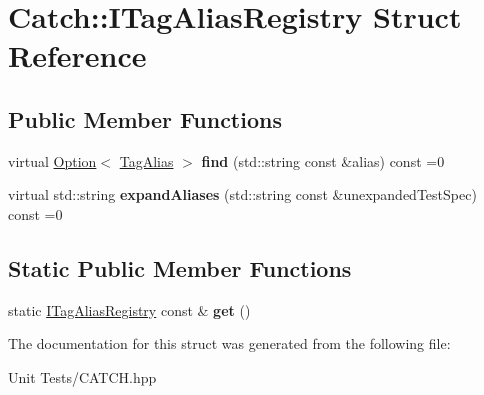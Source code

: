 \hypertarget{structCatch_1_1ITagAliasRegistry}{}\section{Catch\+:\+:I\+Tag\+Alias\+Registry Struct Reference}
\label{structCatch_1_1ITagAliasRegistry}
\subsection*{Public Member Functions}
\begin{DoxyCompactItemize}
\item 
virtual \hyperlink{classCatch_1_1Option}{Option}$<$ \hyperlink{structCatch_1_1TagAlias}{Tag\+Alias} $>$ {\bfseries find} (std\+::string const \&alias) const =0\hypertarget{structCatch_1_1ITagAliasRegistry_a7d2fba4d39cfcc62c2695fcde4f989c3}{}\label{structCatch_1_1ITagAliasRegistry_a7d2fba4d39cfcc62c2695fcde4f989c3}

\item 
virtual std\+::string {\bfseries expand\+Aliases} (std\+::string const \&unexpanded\+Test\+Spec) const =0\hypertarget{structCatch_1_1ITagAliasRegistry_ae729a7532faf7466db1a157ce0395170}{}\label{structCatch_1_1ITagAliasRegistry_ae729a7532faf7466db1a157ce0395170}

\end{DoxyCompactItemize}
\subsection*{Static Public Member Functions}
\begin{DoxyCompactItemize}
\item 
static \hyperlink{structCatch_1_1ITagAliasRegistry}{I\+Tag\+Alias\+Registry} const \& {\bfseries get} ()\hypertarget{structCatch_1_1ITagAliasRegistry_aa9d0f008f49473389c7abf6071f137a7}{}\label{structCatch_1_1ITagAliasRegistry_aa9d0f008f49473389c7abf6071f137a7}

\end{DoxyCompactItemize}


The documentation for this struct was generated from the following file\+:\begin{DoxyCompactItemize}
\item 
Unit Tests/C\+A\+T\+C\+H.\+hpp\end{DoxyCompactItemize}
